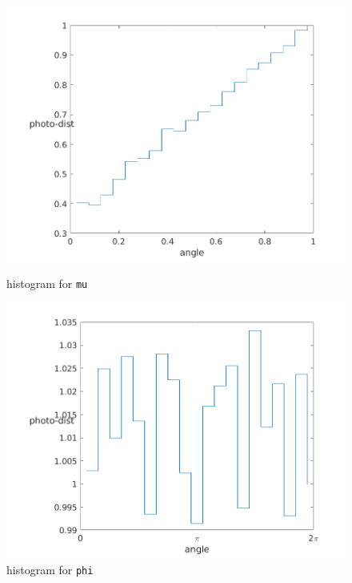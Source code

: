 \documentclass[../main/main.tex]{subfiles}
\begin{document}
\begin{figure}[!htp]
\centering
\begin{minipage}{.5\textwidth}
\includegraphics[width=\textwidth]{../../introductory_exercises/limb_darkening/data/LD_3D_mu_number_channels20number_photons100000max_opt_depth10.png}
\caption{histogram for \texttt{mu}}
\label{3D_mu}
\end{minipage}%
\begin{minipage}{.5\textwidth}
\includegraphics[width=\textwidth]{../../introductory_exercises/limb_darkening/data/LD_3D_phi_number_channels20number_photons100000max_opt_depth10.png}
\caption{histogram for \texttt{phi}}
\label{3D_phi}
\end{minipage}
\end{figure}
\end{document}
